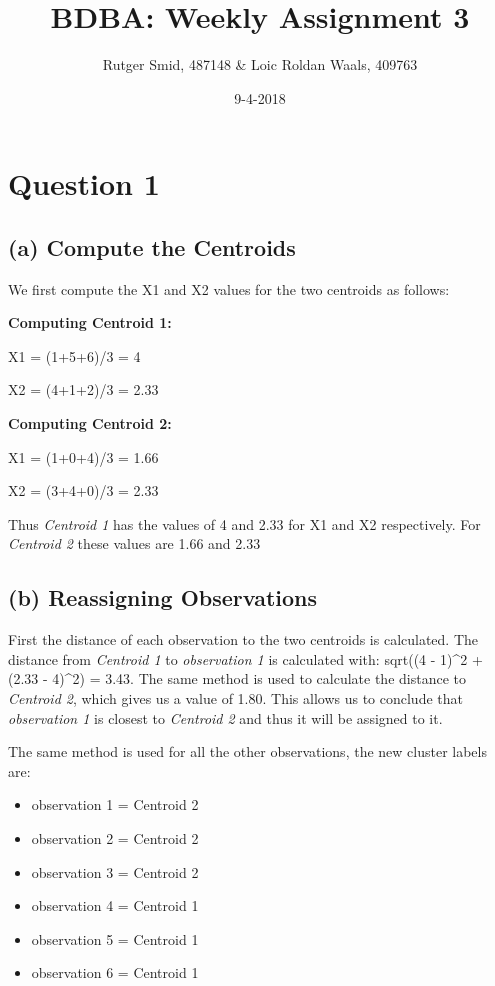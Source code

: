 \documentclass[]{article}
\title{BDBA: Weekly Assignment 3}
\author{Rutger Smid, 487148 \& Loic Roldan Waals, 409763}
\date{9-4-2018}
\providecommand{\tightlist}{%
  \setlength{\itemsep}{0pt}\setlength{\parskip}{0pt}}
\begin{document}
\maketitle

\section{Question 1}\label{question-1}

\subsection{(a) Compute the Centroids}\label{a-compute-the-centroids}

We first compute the X1 and X2 values for the two centroids as follows:

\textbf{Computing Centroid 1:}

X1 = (1+5+6)/3 = 4

X2 = (4+1+2)/3 = 2.33

\textbf{Computing Centroid 2:}

X1 = (1+0+4)/3 = 1.66

X2 = (3+4+0)/3 = 2.33

Thus \emph{Centroid 1} has the values of 4 and 2.33 for X1 and X2
respectively. For \emph{Centroid 2} these values are 1.66 and 2.33

\subsection{(b) Reassigning
Observations}\label{b-reassigning-observations}

First the distance of each observation to the two centroids is
calculated. The distance from \emph{Centroid 1} to \emph{observation 1}
is calculated with: sqrt((4 - 1)\^{}2 + (2.33 - 4)\^{}2) = 3.43. The
same method is used to calculate the distance to \emph{Centroid 2},
which gives us a value of 1.80. This allows us to conclude that
\emph{observation 1} is closest to \emph{Centroid 2} and thus it will be
assigned to it.

The same method is used for all the other observations, the new cluster
labels are:

\begin{itemize}
\tightlist
\item
  observation 1 = Centroid 2
\item
  observation 2 = Centroid 2
\item
  observation 3 = Centroid 2
\item
  observation 4 = Centroid 1
\item
  observation 5 = Centroid 1
\item
  observation 6 = Centroid 1
\end{itemize}
\end{document}
